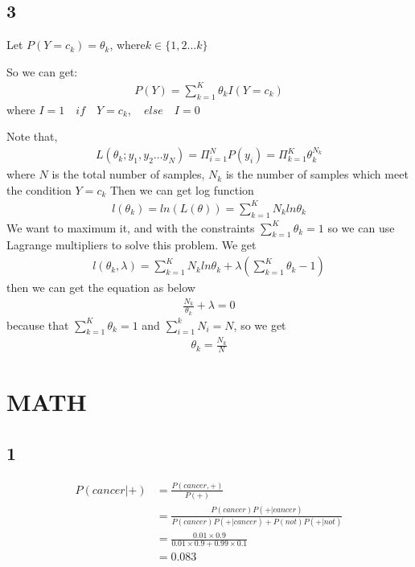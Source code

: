 \documentclass[letterpaper, 10 pt, conference]{ieeeconf}
\begin{document}
\subsection*{3}

Let $P(Y=c_k)=\theta_k$, where$k \in \{1,2\dots k\}$

So we can get:
\begin{align}
    P(Y)=\sum_{k=1}^{K}\theta_kI(Y=c_k)
\end{align}
where $I=1 \quad if \quad Y=c_k ,\quad else \quad I=0$

Note that,
\begin{align}
    L(\theta_k;y_1,y_2 \dots y_N)=\Pi_{i=1}^{N}P(y_i)=\Pi_{k=1}^{K}\theta_k^{N_k}
\end{align}
where $N$ is the total number of samples, $N_k$ is the number of samples which meet the condition $Y=c_k$
Then we can get log function
\begin{align}
    l(\theta_k)=ln(L(\theta))=\sum_{k=1}^{K}N_kln\theta_k
\end{align}
We want to maximum it, and with the constraints $\sum_{k=1}^{K}\theta_k=1$ so we can use Lagrange multipliers to solve this problem.
We get
\begin{align}
    l(\theta_k,\lambda)=\sum_{k=1}^{K}N_kln\theta_k+\lambda(\sum_{k=1}^{K}\theta_k-1)
\end{align}
then we can get the equation as below 
\begin{align}
    \frac{N_k}{\theta_k}+\lambda=0
\end{align}
because that $\sum_{k=1}^{K}\theta_k=1$ and $\sum_{i=1}^{k}N_i=N$, so we get
\begin{align}
    \theta_k=\frac{N_k}{N}
\end{align}


\section{MATH}
\subsection*{1}
\begin{align}
    P(cancer|+) & = \frac{P(cancer,+)}{P(+)} \\
    & = \frac{P(cancer)P(+|cancer)}{P(cancer)P(+|cancer)+P(not)P(+|not)} \\
    & = \frac{0.01 \times 0.9}{0.01 \times 0.9+0.99\times 0.1} \\
    & = 0.083
\end{align}
\end{document}
